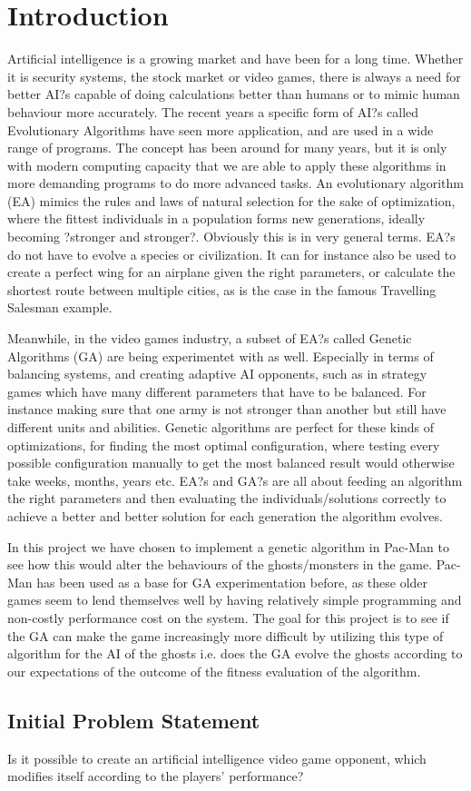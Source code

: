 \section{Introduction} \label{sec:introduction}
Artificial intelligence is a growing market and have been for a long time. Whether it is security systems, the stock market or video games, there is always a need for better AI?s capable of doing calculations better than humans or to mimic human behaviour more accurately. The recent years a specific form of AI?s called Evolutionary Algorithms have seen more application, and are used in a wide range of programs. The concept has been around for many years, but it is only with modern computing capacity that we are able to apply these algorithms in more demanding programs to do more advanced tasks. An evolutionary algorithm (EA) mimics the rules and laws of natural selection for the sake of optimization, where the fittest individuals in a population forms new generations, ideally becoming ?stronger and stronger?. Obviously this is in very general terms. EA?s do not have to evolve a species or civilization. It can for instance also be used to create a perfect wing for an airplane given the right parameters, or calculate the shortest route between multiple cities, as is the case in the famous Travelling Salesman example. 

Meanwhile, in the video games industry, a subset of EA?s called Genetic Algorithms (GA) are being experimentet with as well. Especially in terms of balancing systems, and creating adaptive AI opponents, such as in strategy games which have many different parameters that have to be balanced. For instance making sure that one army is not stronger than another but still have different units and abilities. Genetic algorithms are perfect for these kinds of optimizations, for finding the most optimal configuration, where testing every possible configuration manually to get the most balanced result would otherwise take weeks, months, years etc. EA?s and GA?s are all about feeding an algorithm the right parameters and then evaluating the individuals/solutions correctly to achieve a better and better solution for each generation the algorithm evolves.

In this project we have chosen to implement a genetic algorithm in Pac-Man to see how this would alter the behaviours of the ghosts/monsters in the game. Pac-Man has been used as a base for GA experimentation before, as these older games seem to lend themselves well by having relatively simple programming and non-costly performance cost on the system. The goal for this project is to see if the GA can make the game increasingly more difficult by utilizing this type of algorithm for the AI of the ghosts i.e. does the GA evolve the ghosts according to our expectations of the outcome of the fitness evaluation of the algorithm.


\subsection{Initial Problem Statement} \label{sec:initialproblemstatement}
Is it possible to create an artificial intelligence video game opponent, which modifies itself according to the players' performance?
